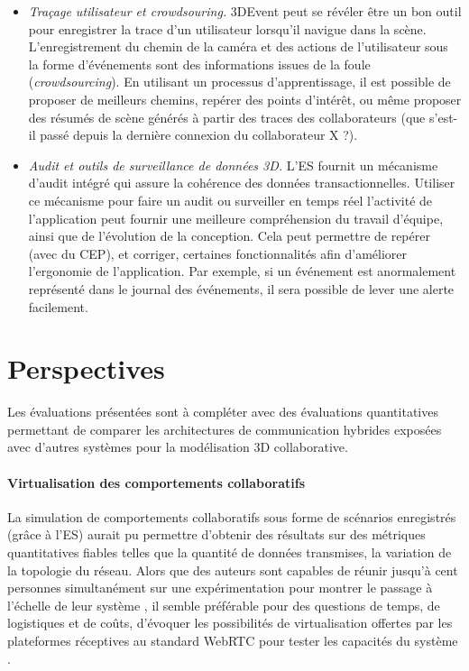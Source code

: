 \begin{itemize}
	\item \textit{Traçage utilisateur et \textit{crowdsouring}.} 3DEvent peut se révéler être 
	un bon outil pour enregistrer la trace d'un utilisateur lorsqu'il navigue dans la 
	scène. L'enregistrement du chemin de la caméra et des actions de l'utilisateur 
	sous la forme d'événements sont des informations 
	\og issues de la foule\fg{} (\textit{crowdsourcing}). En utilisant un processus 
	d'apprentissage, il est possible de proposer de meilleurs chemins, repérer des 
	points d'intérêt, ou même proposer des résumés de scène générés à partir des 
	traces des collaborateurs (que s'est-il passé depuis la dernière connexion du 
	collaborateur X ?).
	\item \textit{Audit et outils de surveillance de données 3D.} L'\gls{ES} fournit un 
	mécanisme 
	d'audit intégré qui assure la cohérence des données transactionnelles. Utiliser 
	ce mécanisme pour faire un audit ou surveiller en temps réel l'activité de 
	l'application peut fournir une meilleure compréhension du travail d'équipe, ainsi 
	que de l'évolution de la conception. Cela peut permettre de repérer (avec du 
	\gls{CEP}), et corriger, certaines fonctionnalités afin d'améliorer l'ergonomie de 
	l'application. Par exemple, si un événement est anormalement représenté dans 
	le journal des événements, il sera possible de lever une alerte facilement.
\end{itemize}

\section{Perspectives}
Les évaluations présentées sont à compléter avec des évaluations quantitatives 
permettant de comparer les architectures de communication hybrides exposées avec 
d'autres systèmes pour la modélisation 3D collaborative. 

\paragraph{Virtualisation des comportements collaboratifs}
La simulation de comportements 
collaboratifs sous forme de scénarios enregistrés (grâce à l'\gls{ES}) aurait pu 
permettre d'obtenir des résultats sur des métriques quantitatives fiables telles que la 
quantité de données transmises, la variation de la topologie du 
réseau. Alors que des auteurs sont capables de réunir jusqu'à cent personnes 
simultanément sur une expérimentation pour montrer le passage à l'échelle de leur 
système \cite{Hu2017}, il semble préférable pour des questions de temps, de 
logistiques et de coûts, d'évoquer les possibilités de virtualisation offertes par les 
plateformes réceptives au standard WebRTC pour tester les capacités du système 
\cite{Haque2016}.

